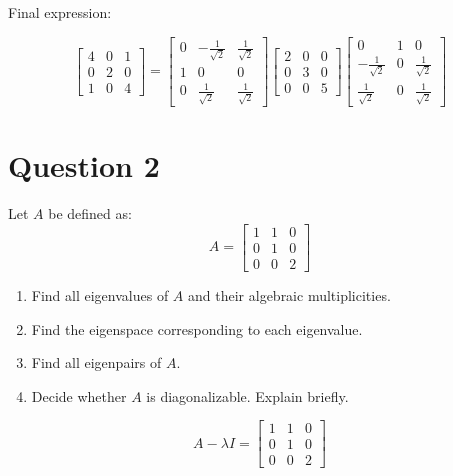 Final expression:

\[
	\begin{bmatrix}
		4 & 0 & 1 \\
		0 & 2 & 0 \\
		1 & 0 & 4
	\end{bmatrix} =
	\begin{bmatrix}
		0 & -\frac{1}{\sqrt{2}} & \frac{1}{\sqrt{2}} \\
		1 & 0                   & 0                  \\
		0 & \frac{1}{\sqrt{2}}  & \frac{1}{\sqrt{2}}
	\end{bmatrix}
	\begin{bmatrix}
		2 & 0 & 0 \\
		0 & 3 & 0 \\
		0 & 0 & 5
	\end{bmatrix}
	\begin{bmatrix}
		0                   & 1 & 0                  \\
		-\frac{1}{\sqrt{2}} & 0 & \frac{1}{\sqrt{2}} \\
		\frac{1}{\sqrt{2}}  & 0 & \frac{1}{\sqrt{2}}
	\end{bmatrix}
\]

\section{Question 2}
Let $A$ be defined as:
\[
	A = \begin{bmatrix}
		1 & 1 & 0 \\
		0 & 1 & 0 \\
		0 & 0 & 2
	\end{bmatrix}
\]
\begin{enumerate}
	\item[(a)] Find all eigenvalues of $A$ and their algebraic multiplicities.
	\item[(b)] Find the eigenspace corresponding to each eigenvalue.
	\item[(c)] Find all eigenpairs of $A$.
	\item[(d)] Decide whether $A$ is diagonalizable. Explain briefly.
\end{enumerate}
\[
	A-\lambda I =
	\begin{bmatrix}
		1 & 1 & 0 \\
		0 & 1 & 0 \\
		0 & 0 & 2
	\end{bmatrix}
\]

